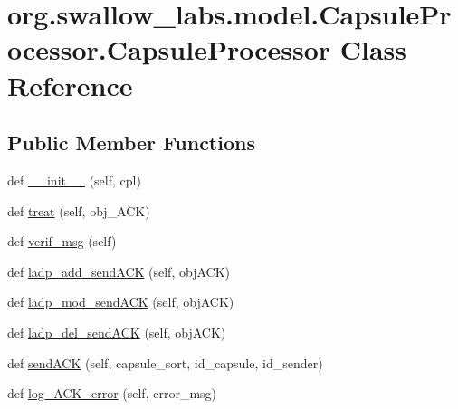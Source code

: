 \hypertarget{classorg_1_1swallow__labs_1_1model_1_1_capsule_processor_1_1_capsule_processor}{}\section{org.\+swallow\+\_\+labs.\+model.\+Capsule\+Processor.\+Capsule\+Processor Class Reference}
\label{classorg_1_1swallow__labs_1_1model_1_1_capsule_processor_1_1_capsule_processor}
\subsection*{Public Member Functions}
\begin{DoxyCompactItemize}
\item 
def \hyperlink{classorg_1_1swallow__labs_1_1model_1_1_capsule_processor_1_1_capsule_processor_af3a45dd6658d48d59932919c9a9db093}{\+\_\+\+\_\+init\+\_\+\+\_\+} (self, cpl)
\item 
def \hyperlink{classorg_1_1swallow__labs_1_1model_1_1_capsule_processor_1_1_capsule_processor_a4d045f6cb4808f41dee3664e0edbabab}{treat} (self, obj\+\_\+\+A\+C\+K)
\item 
def \hyperlink{classorg_1_1swallow__labs_1_1model_1_1_capsule_processor_1_1_capsule_processor_a49beb7c5f429df2912aa95c88292e0b3}{verif\+\_\+msg} (self)
\item 
def \hyperlink{classorg_1_1swallow__labs_1_1model_1_1_capsule_processor_1_1_capsule_processor_a69fca3713c5a9bec49ecddefb2e72e15}{ladp\+\_\+add\+\_\+send\+A\+C\+K} (self, obj\+A\+C\+K)
\item 
def \hyperlink{classorg_1_1swallow__labs_1_1model_1_1_capsule_processor_1_1_capsule_processor_a58b2cb109b0238f60437114d9bdb61fa}{ladp\+\_\+mod\+\_\+send\+A\+C\+K} (self, obj\+A\+C\+K)
\item 
def \hyperlink{classorg_1_1swallow__labs_1_1model_1_1_capsule_processor_1_1_capsule_processor_aca31fd84604e374969e6ce9d3874690f}{ladp\+\_\+del\+\_\+send\+A\+C\+K} (self, obj\+A\+C\+K)
\item 
def \hyperlink{classorg_1_1swallow__labs_1_1model_1_1_capsule_processor_1_1_capsule_processor_adbcd4329c2e779e0d4f31772a404cd79}{send\+A\+C\+K} (self, capsule\+\_\+sort, id\+\_\+capsule, id\+\_\+sender)
\item 
def \hyperlink{classorg_1_1swallow__labs_1_1model_1_1_capsule_processor_1_1_capsule_processor_a7f90ed1835ce56f065fc194c5ca8981b}{log\+\_\+\+A\+C\+K\+\_\+error} (self, error\+\_\+msg)
\end{DoxyCompactItemize}
